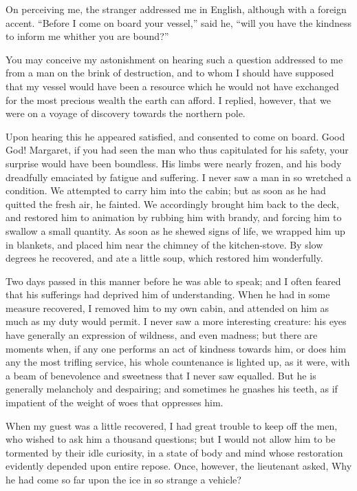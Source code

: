 On perceiving me, the stranger addressed
me in English, although with
a foreign accent. ``Before I come on
board your vessel,'' said he, ``will you
have the kindness to inform me whither
you are bound?''

You may conceive my astonishment
on hearing such a question addressed
to me from a man on the brink of destruction,
and to whom I should have
supposed that my vessel would have
been a resource which he would not
have exchanged for the most precious
wealth the earth can afford. I replied,
however, that we were on a voyage
of discovery towards the northern
pole.

Upon hearing this he appeared satisfied,
and consented to come on board.
Good God! Margaret, if you had seen
the man who thus capitulated for his
safety, your surprise would have been
boundless. His limbs were nearly frozen,
and his body dreadfully emaciated
by fatigue and suffering. I never saw a
man in so wretched a condition. We
attempted to carry him into the cabin;
but as soon as he had quitted the fresh
air, he fainted. We accordingly
brought him back to the deck, and
restored him to animation by rubbing
him with brandy, and forcing him to
swallow a small quantity. As soon as
he shewed signs of life, we wrapped
him up in blankets, and placed him
near the chimney of the kitchen-stove.
By slow degrees he recovered, and ate
a little soup, which restored him wonderfully.

Two days passed in this manner before
he was able to speak; and I often
feared that his sufferings had deprived
him of understanding. When he had
in some measure recovered, I removed
him to my own cabin, and attended on
him as much as my duty would permit.
I never saw a more interesting creature:
his eyes have generally an expression
of wildness, and even madness;
but there are moments when, if
any one performs an act of kindness
towards him, or does him any the most
trifling service, his whole countenance
is lighted up, as it were, with a beam
of benevolence and sweetness that I
never saw equalled. But he is generally
melancholy and despairing; and
sometimes he gnashes his teeth, as if
impatient of the weight of woes that
oppresses him.

When my guest was a little recovered,
I had great trouble to keep off
the men, who wished to ask him a
thousand questions; but I would not
allow him to be tormented by their
idle curiosity, in a state of body and
mind whose restoration evidently depended
upon entire repose. Once,
however, the lieutenant asked, Why he
had come so far upon the ice in so
strange a vehicle?

